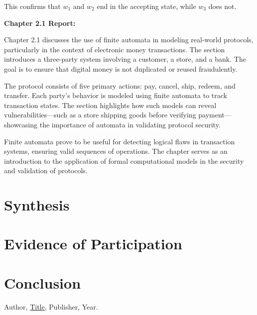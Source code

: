 \documentclass{article}
\theoremstyle{theorem}
\theoremstyle{definition}
\theoremstyle{remark}
\begin{document}
This confirms that $w_1$ and $w_2$ end in the accepting state, while $w_3$ does not.


\textbf{Chapter 2.1 Report:}

Chapter 2.1 discusses the use of finite automata in modeling real-world protocols, particularly in the context of electronic money transactions. The section introduces a three-party system involving a customer, a store, and a bank. The goal is to ensure that digital money is not duplicated or reused fraudulently.

The protocol consists of five primary actions: pay, cancel, ship, redeem, and transfer. Each party's behavior is modeled using finite automata to track transaction states. The section highlights how such models can reveal vulnerabilities—such as a store shipping goods before verifying payment—showcasing the importance of automata in validating protocol security.

Finite automata prove to be useful for detecting logical flaws in transaction systems, ensuring valid sequences of operations. The chapter serves as an introduction to the application of formal computational models in the security and validation of protocols.


\section{Synthesis}

\section{Evidence of Participation}

\section{Conclusion}\label{conclusion}

\begin{thebibliography}{99}
 Author, \href{https://en.wikipedia.org/wiki/LaTeX}{Title}, Publisher, Year.
\end{thebibliography}
\end{document}
